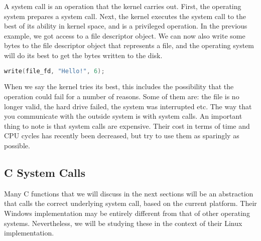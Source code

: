 A system call is an operation that the kernel carries out.
First, the operating system prepares a system call. Next, the kernel executes the system call to the best of its ability in kernel space, and is a privileged operation.
In the previous example, we got access to a file descriptor object.
We can now also write some bytes to the file descriptor object that represents a file, and the operating system will do its best to get the bytes written to the disk.

\begin{lstlisting}[language=C]
write(file_fd, "Hello!", 6);
\end{lstlisting}

When we say the kernel tries its best, this includes the possibility that the operation could fail for a number of reasons. Some of them are: the file is no longer valid, the hard drive failed, the system was interrupted etc.
The way that you communicate with the outside system is with system calls.
An important thing to note is that system calls are expensive.
Their cost in terms of time and CPU cycles has recently been decreased, but try to use them as sparingly as possible.

\subsection{C System Calls}

Many C functions that we will discuss in the next sections will be an abstraction that calls the correct underlying system call, based on the current platform. 
Their Windows implementation may be entirely different from that of other operating systems.
Nevertheless, we will be studying these in the context of their Linux implementation.


